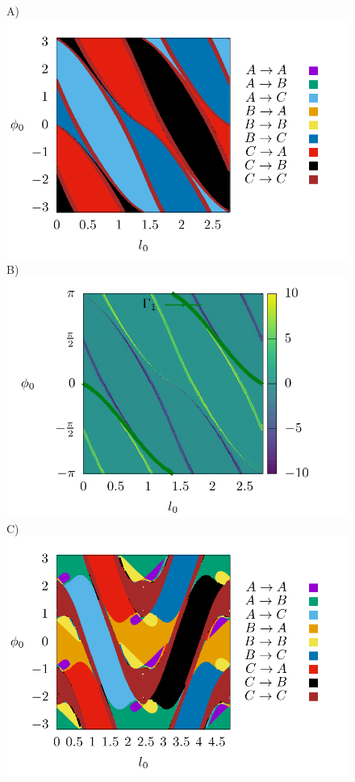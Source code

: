 \documentclass[10pt,aps,onecolumn,superscriptaddress]{revtex4-2}
\begin{document}
\begin{figure}[htbp]
	A)\includegraphics[scale=0.35]{fate_map_ds_gamma1E_001.png}
	B)\includegraphics[scale=0.35]{ld_action_ds_gamma1_E_001.png}
	C)\includegraphics[scale=0.35]{fate_map_ds_gamma2E_001.png}

\end{figure}
\end{document}
